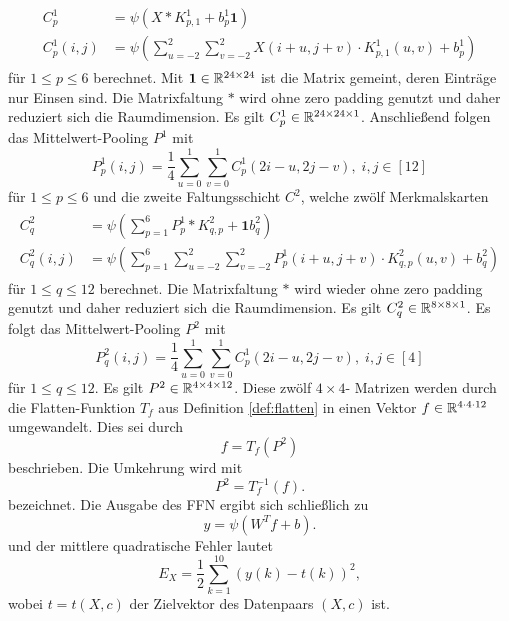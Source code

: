 \begin{align}
    \label{eq:C1_forw}
    \begin{split}
    C_p^1 &= \psi(X \ast K_{p,1}^1+b_p^1 \mathbf{1}) \\
    C_p^1(i,j)&=\psi \left(\sum_{u=-2}^2 \sum_{v=-2}^2 X(i+u,j+v) \cdot K_{p,1}^1(u,v) +b_p^1\right)
    \end{split}
\end{align}
für $1 \leq p \leq 6$ berechnet. Mit $\mathbf{1} \in \mathbb{R}^{24 \times 24}$ ist die Matrix gemeint, deren Einträge nur Einsen sind. Die Matrixfaltung $\ast$ wird ohne zero padding genutzt und daher reduziert sich die Raumdimension. Es gilt $C^1_p \in \mathbb{R}^{24 \times 24 \times 1}$. Anschließend folgen das Mittelwert-Pooling $P^1$ mit
\begin{equation}
    \label{eq:P1_forw}
    P^1_p(i,j) =\frac{1}{4} \sum_{u=0}^1 \sum_{v=0}^1 C_p^1(2i-u, 2j-v), \; i,j \in [12]
\end{equation}
für $1 \leq p \leq 6$ und die zweite Faltungsschicht $C^2$, welche zwölf Merkmalskarten
\begin{align}
    \label{eq:C2_forw}
    \begin{split}
        C_q^2 &= \psi \left( \sum_{p=1}^6 P_p^1 \ast K_{q,p}^2 + \mathbf{1} b_q^2\right) \\
        C_q^2(i,j) &= \psi \left( \sum_{p=1}^6 \sum_{u=-2}^2 \sum_{v=-2}^2 P^1_p(i+u,j+v) \cdot K^2_{q,p}(u,v) +b_q^2\right)
    \end{split}
\end{align}
für $1 \leq q \leq 12$ berechnet. Die Matrixfaltung $\ast$ wird wieder ohne zero padding genutzt und daher reduziert sich die Raumdimension.
Es gilt $C_q^2 \in \mathbb{R}^{8 \times 8 \times 1}$. Es folgt das Mittelwert-Pooling $P^2$ mit
\begin{equation}
    \label{eq:P2_forw}
    P_q^2(i,j)= \frac{1}{4} \sum_{u=0}^1 \sum_{v=0}^1 C_p^1(2i-u, 2j-v), \; i,j \in [4]
\end{equation}
für $1 \leq q \leq 12$. Es gilt $P^2\in \mathbb{R}^{4 \times 4 \times 12}$. Diese zwölf $4 \times 4$- Matrizen werden durch die Flatten-Funktion $T_f$ aus Definition \ref{def:flatten} in einen Vektor $f \in \mathbb{R}^{4 \cdot 4 \cdot 12}$ umgewandelt. Dies sei durch
\begin{equation}
    \label{eq:f_forw}
    f=T_f(P^2)
\end{equation}
beschrieben. 
Die Umkehrung wird mit
\begin{equation}
    \label{eq_f_ford_inv}
    P^2=T_f^{-1}(f).
\end{equation}
bezeichnet.
Die Ausgabe des FFN ergibt sich schließlich zu
\begin{equation}
    \label{eq:y_forw}
    y=\psi(W^T f +b).
\end{equation}
und der mittlere quadratische Fehler lautet
\begin{equation}
    \label{eq:E_forw}
    E_{X}=\frac{1}{2} \sum_{k=1}^{10} \left(y(k)-t(k)\right)^2,
\end{equation}
wobei $t=t(X,c)$ der Zielvektor des Datenpaars $(X,c)$ ist.

